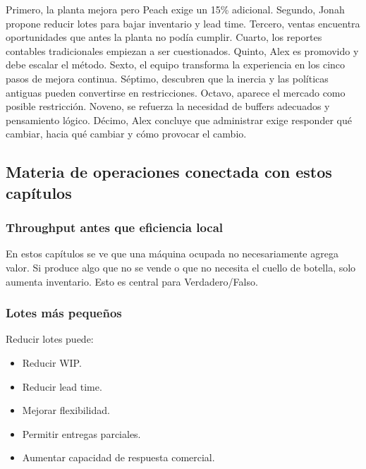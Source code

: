 \documentclass[
  11pt,
]{article}
\providecommand{\tightlist}{%
  \setlength{\itemsep}{0pt}\setlength{\parskip}{0pt}}
\begin{document}
Primero, la planta mejora pero Peach exige un 15\% adicional. Segundo,
Jonah propone reducir lotes para bajar inventario y lead time. Tercero,
ventas encuentra oportunidades que antes la planta no podía cumplir.
Cuarto, los reportes contables tradicionales empiezan a ser
cuestionados. Quinto, Alex es promovido y debe escalar el método. Sexto,
el equipo transforma la experiencia en los cinco pasos de mejora
continua. Séptimo, descubren que la inercia y las políticas antiguas
pueden convertirse en restricciones. Octavo, aparece el mercado como
posible restricción. Noveno, se refuerza la necesidad de buffers
adecuados y pensamiento lógico. Décimo, Alex concluye que administrar
exige responder qué cambiar, hacia qué cambiar y cómo provocar el
cambio.

\hypertarget{materia-de-operaciones-conectada-con-estos-capuxedtulos}{%
\subsection{Materia de operaciones conectada con estos
capítulos}\label{materia-de-operaciones-conectada-con-estos-capuxedtulos}}

\hypertarget{throughput-antes-que-eficiencia-local}{%
\subsubsection{Throughput antes que eficiencia
local}\label{throughput-antes-que-eficiencia-local}}

En estos capítulos se ve que una máquina ocupada no necesariamente
agrega valor. Si produce algo que no se vende o que no necesita el
cuello de botella, solo aumenta inventario. Esto es central para
Verdadero/Falso.

\hypertarget{lotes-muxe1s-pequeuxf1os}{%
\subsubsection{Lotes más pequeños}\label{lotes-muxe1s-pequeuxf1os}}

Reducir lotes puede:

\begin{itemize}
\tightlist
\item
  Reducir WIP.
\item
  Reducir lead time.
\item
  Mejorar flexibilidad.
\item
  Permitir entregas parciales.
\item
  Aumentar capacidad de respuesta comercial.
\end{itemize}
\end{document}
